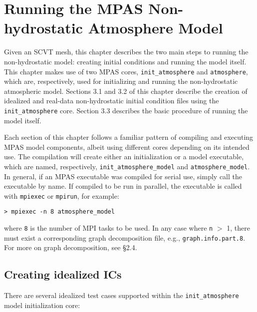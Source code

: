 
\chapter{Running the MPAS Non-hydrostatic Atmosphere Model}
\label{chap:running_mpas_a}

\setlength\LTleft{0.0in}

Given an SCVT mesh, this chapter describes the two main steps to running the non-hydrostatic model: creating initial conditions and running the model itself.  This chapter makes use of two MPAS cores, {\tt init\_atmosphere} and {\tt atmosphere}, which are, respectively, used for initializing and running the non-hydrostatic atmospheric model.  Sections 3.1 and 3.2 of this chapter describe the creation of idealized and real-data non-hydrostatic initial condition files using the {\tt init\_atmosphere} core.   Section 3.3 describes the basic procedure of running the model itself.

Each section of this chapter follows a familiar pattern of compiling and executing MPAS model components, albeit using different cores depending on its intended use.  The compilation will create either an initialization or a model executable, which are named, respectively, {\tt init\_atmosphere\_model} and {\tt atmosphere\_model}.  In general, if an MPAS executable was compiled for serial use, simply call the executable by name. If compiled to be run in parallel, the executable is called with {\tt mpiexec} or {\tt mpirun}, for example:

\vspace{12pt}
{\tt > mpiexec -n 8 atmosphere\_model}
\vspace{12pt}


\noindent where {\tt 8} is the number of MPI tasks to be used.  In any case where {\tt n} $>$ 1, there must exist a corresponding graph decomposition file, e.g., {\tt graph.info.part.8}. For more on graph decomposition, see \S 2.4.  

\section{Creating idealized ICs}

There are several idealized test cases supported within the {\tt init\_atmosphere} model initialization core:

